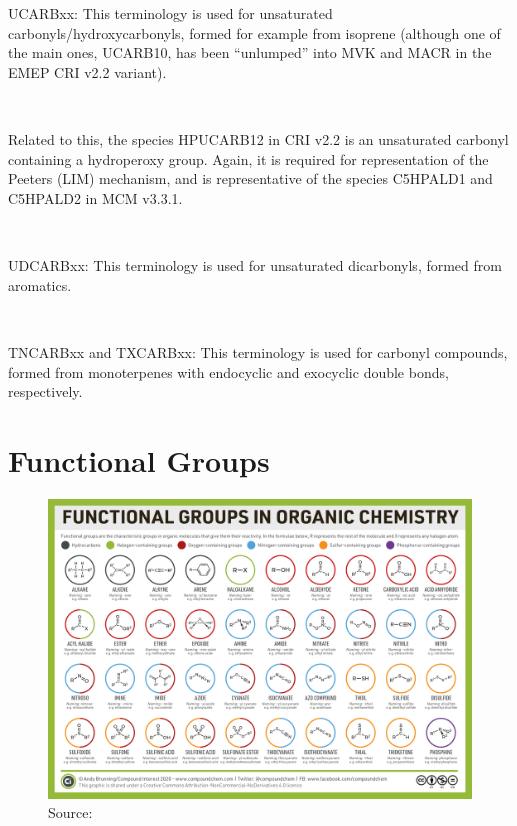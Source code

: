 {{\\}\\ \parbox{\textwidth}{
UCARBxx: This terminology is used for unsaturated carbonyls/hydroxycarbonyls, formed for example from isoprene (although one of the main ones, UCARB10, has been “unlumped” into MVK and MACR in the EMEP CRI v2.2 variant).
\\}\\ \parbox{\textwidth}{
Related to this, the species HPUCARB12 in CRI v2.2 is an unsaturated carbonyl containing a hydroperoxy group. Again, it is required for representation of the Peeters (LIM) mechanism, and is representative of the species C5HPALD1 and C5HPALD2 in MCM v3.3.1.
\\}\\ \parbox{\textwidth}{
UDCARBxx: This terminology is used for unsaturated dicarbonyls, formed from aromatics.
\\}\\ \parbox{\textwidth}{
TNCARBxx and TXCARBxx: This terminology is used for carbonyl compounds, formed from monoterpenes with endocyclic and exocyclic double bonds, respectively.

}}



\section{Functional Groups}\label{appendix:fngroups}
\begin{figure}[H]
\centering
\includegraphics[width=.9\textheight,angle=90]{fngroups.png}
{Source:\cite{fgps}}
\end{figure}

